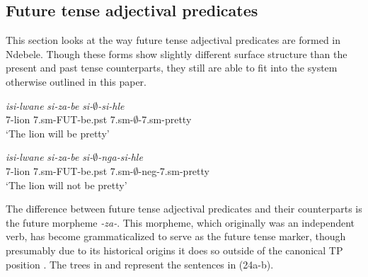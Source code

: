 \documentclass[output=paper]{langsci/langscibook}
\begin{document}
\subsection{Future tense adjectival predicates}

This section looks at the way future tense adjectival predicates are formed in Ndebele. Though these forms show slightly different surface structure than the present and past tense counterparts, they still are able to fit into the system otherwise outlined in this paper.


\begin{exe}
\ex \begin{xlist}
\ex \gll \textit{isi-lwane} \textit{si-za-be} \textit{si-$\emptyset$-si-hle}\\
       7-lion 7.{\sc sm}-FUT-be.{\sc pst} 7.{\sc sm}-$\emptyset$-7.{\sc sm}-pretty\\
    \glt `The lion will be pretty' 

\ex \gll \textit{isi-lwane} \textit{si-za-be} \textit{si-$\emptyset$-nga-si-hle}\\
       7-lion 7.{\sc sm}-FUT-be.{\sc pst} 7.{\sc sm}-$\emptyset$-{\sc neg}-7.{\sc sm}-pretty\\
    \glt `The lion will not be pretty' 
\end{xlist}
\end{exe}

The difference between future tense adjectival predicates and their counterparts is the future morpheme \textit{-za-}. This morpheme, which originally was an independent verb, has become grammaticalized to serve as the future tense marker, though presumably due to its historical origins it does so outside of the canonical TP position \citep{Sibanda2004}. The trees in  and  represent the sentences in (24a-b).
\end{document}
